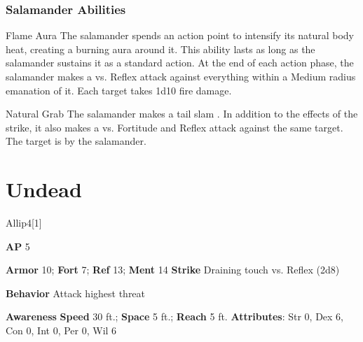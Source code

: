 \subsubsection{Salamander Abilities}

\begin{ability}{Flame Aura}
The salamander spends an action point to intensify its natural body heat, creating a burning aura around it.
This ability lasts as long as the salamander sustains it as a standard action.
At the end of each action phase, the salamander makes a  vs. Reflex
attack against everything within a Medium radius emanation of it.
\hit Each target takes 1d10 fire damage.
\end{ability}

\vspace{0.5em}
\begin{ability}{Natural Grab}
The salamander makes a tail slam .
In addition to the effects of the strike, it also makes a  vs. Fortitude and Reflex attack against the same target.
\hit The target is  by the salamander.
\end{ability}





\section{Undead}

\begin{monsection}{Allip}{4}[1]
\vspace{-1em}\vspace{-1em}
\begin{spellcontent}
\begin{spelltargetinginfo}
{\textbf{AP} 5}

\pari \textbf{Armor} 10;
\textbf{Fort} 7;
\textbf{Ref} 13;
\textbf{Ment} 14
\pari \textbf{Strike} Draining touch  vs. Reflex (2d8)



\pari \textbf{Behavior} Attack highest threat
\end{spelltargetinginfo}
\end{spellcontent}

\begin{monsterfooter}
\pari \textbf{Awareness} 
\pari \textbf{Speed} 30 ft.;
\textbf{Space} 5 ft.;
\textbf{Reach} 5 ft.
\pari \textbf{Attributes}:
Str 0,
Dex 6,
Con 0,
Int 0,
Per 0,
Wil 6
\end{monsterfooter}
\end{monsection}





